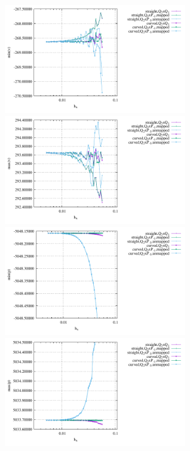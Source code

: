 \begin{center}
\includegraphics[width=8cm]{python_codes/fieldstone_25/results/isoviscous/min_v.pdf}
\includegraphics[width=8cm]{python_codes/fieldstone_25/results/isoviscous/max_v.pdf}\\
\includegraphics[width=8cm]{python_codes/fieldstone_25/results/isoviscous/min_p.pdf}
\includegraphics[width=8cm]{python_codes/fieldstone_25/results/isoviscous/max_p.pdf}\\
\end{center}



